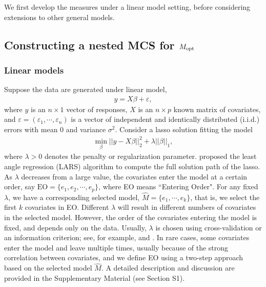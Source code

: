 \documentclass[12pt]{article} %
\theoremstyle{definition}
\begin{document}
We first develop the measures under a linear model setting, before considering extensions to other general models.
\subsection{Constructing a nested MCS for $M_{\rm opt}$}
\subsubsection{Linear models}
Suppose the data are generated under linear model,
\begin{eqnarray}
    y = X \beta+\varepsilon,
\end{eqnarray}\label{eq:Lreg}
where $y$ is an $n\times 1$ vector of responses, $X$ is an $n\times p$ known matrix of covariates, and $\varepsilon= (\varepsilon_1, \cdots, \varepsilon_n)$ is a vector of independent and identically distributed (i.i.d.) errors with mean $0$ and variance $\sigma^2$. Consider a lasso solution fitting the model
\begin{eqnarray}
\min_{\beta} ||y-X\beta||_2^2+ \lambda ||\beta||_1,\label{lassof}
\end{eqnarray}
where $\lambda>0$ denotes the penalty or regularization parameter. \citet{efron2004} proposed the least angle regression (LARS) algorithm to compute the full solution path of the lasso. As $\lambda$ decreases from a large value, the covariates enter the model at a certain order, say $\text{EO}= \{e_1, e_2, \cdots, e_p\}$, where EO means ``Entering Order". For any fixed $\lambda$, we have a corresponding selected model, $\hat{M}=\{e_1, \cdots, e_k\}$, that is, we select the first $k$ covariates in EO. Different $\lambda$ will result in different numbers of covariates in the selected model. However, the order of the covariates entering the model is fixed, and depends only on the data. Usually, $\lambda$ is chosen using cross-validation or an information criterion; see, for example, \citet{Fu2005} and \citet{wang2009}. In rare cases, some covariates enter the model and leave multiple times, usually because of the strong correlation between covariates, and we define EO using a two-step approach based on the selected model $\hat{M}$. A detailed description and discussion are provided in the Supplementary Material (see Section S1).
\end{document}
